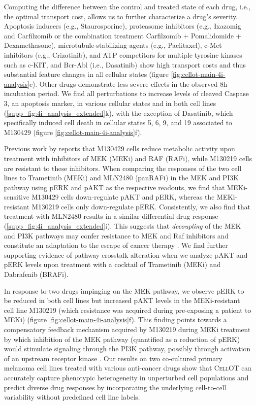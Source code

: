 Computing the difference between the control and treated state of each drug, i.e., the optimal
transport cost, allows us to further characterize a drug's severity. 
Apoptosis inducers (e.g., Staurosporine), proteasome inhibitors (e.g., Ixazomig and Carfilzomib or the combination treatment Carfilzomib + Pomalidomide + Dexamethasone), microtubule-stabilizing agents (e.g., Paclitaxel), c-Met inhibitors (e.g., Crizotinib), and ATP competitors for multiple tyrosine kinases such as c-KIT, and Bcr-Abl (i.e., Dasatinib) show high transport costs and thus substantial feature changes in all cellular states (figure \ref{fig:cellot-main-4i-analysis}e).
Other drugs demonstrate less severe effects in the observed 8h incubation period. 
We find all perturbations to increase levels of cleaved Caspase 3, an apoptosis marker, in various cellular states and in both cell lines (\ref{supp_fig:4i_analysis_extended}k),
with the exception of Dasatinib, which specifically induced cell death in cellular states 5, 6, 9, and 19 associated to M130429 (figure \ref{fig:cellot-main-4i-analysis}f).


Previous work by \citet{smith2016inhibiting} reports that M130429 cells reduce metabolic activity %
upon treatment with inhibitors of MEK (MEKi) and RAF (RAFi), while M130219 cells are resistant to these inhibitors.
When comparing the responses of the two cell lines to Trametinib (MEKi) and MLN2480 (panRAFi) in the MEK and PI3K pathway using pERK and pAKT as the respective readouts, we find that MEKi-sensitive M130429 cells down-regulate pAKT and pERK, whereas the MEKi-resistant M130219 cells only down-regulate pERK.
Consistently, we also find that treatment with MLN2480 results in a similar differential drug response (\ref{supp_fig:4i_analysis_extended}i).
This suggests that \textit{decoupling} of the MEK and PI3K pathways may confer resistance to MEK and Raf inhibitors and constitute an adaptation to the escape of cancer therapy \cite{kun2021mek}.
We find further supporting evidence of pathway crosstalk alteration when we analyze pAKT and pERK levels upon treatment with a cocktail of Trametinib (MEKi) and Dabrafenib (BRAFi). 

In response to two drugs impinging on the MEK pathway, we observe pERK to be reduced in both cell lines but increased pAKT levels in the MEKi-resistant cell line M130219 (which resistance was acquired during pre-exposing a patient to MEKi) (figure \ref{fig:cellot-main-4i-analysis}f).
This finding points towards a compensatory feedback mechanism acquired by M130219 during MEKi treatment by which inhibition of the MEK pathway (quantified as a reduction of pERK) would stimulate signaling through the PI3K pathway, possibly through activation of an upstream receptor kinase \cite{caunt2015mek1}. 
Our results on two co-cultured primary melanoma cell lines treated with various anti-cancer drugs show that \textsc{CellOT} can accurately capture phenotypic heterogeneity in unperturbed cell populations and predict diverse drug responses by incorporating the underlying cell-to-cell variability without predefined cell line labels. 

